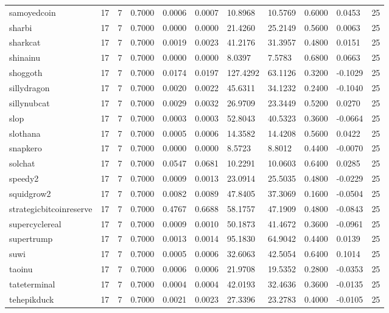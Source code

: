 \begin{table}[htbp]
\begin{tabular}{lllllllllll}
samoyedcoin & 17 & 7 & 0.7000 & 0.0006 & 0.0007 & 10.8968 & 10.5769 & 0.6000 & 0.0453 & 25 \\
sharbi & 17 & 7 & 0.7000 & 0.0000 & 0.0000 & 21.4260 & 25.2149 & 0.5600 & 0.0063 & 25 \\
sharkcat & 17 & 7 & 0.7000 & 0.0019 & 0.0023 & 41.2176 & 31.3957 & 0.4800 & 0.0151 & 25 \\
shinainu & 17 & 7 & 0.7000 & 0.0000 & 0.0000 & 8.0397 & 7.5783 & 0.6800 & 0.0663 & 25 \\
shoggoth & 17 & 7 & 0.7000 & 0.0174 & 0.0197 & 127.4292 & 63.1126 & 0.3200 & -0.1029 & 25 \\
sillydragon & 17 & 7 & 0.7000 & 0.0020 & 0.0022 & 45.6311 & 34.1232 & 0.2400 & -0.1040 & 25 \\
sillynubcat & 17 & 7 & 0.7000 & 0.0029 & 0.0032 & 26.9709 & 23.3449 & 0.5200 & 0.0270 & 25 \\
slop & 17 & 7 & 0.7000 & 0.0003 & 0.0003 & 52.8043 & 40.5323 & 0.3600 & -0.0664 & 25 \\
slothana & 17 & 7 & 0.7000 & 0.0005 & 0.0006 & 14.3582 & 14.4208 & 0.5600 & 0.0422 & 25 \\
snapkero & 17 & 7 & 0.7000 & 0.0000 & 0.0000 & 8.5723 & 8.8012 & 0.4400 & -0.0070 & 25 \\
solchat & 17 & 7 & 0.7000 & 0.0547 & 0.0681 & 10.2291 & 10.0603 & 0.6400 & 0.0285 & 25 \\
speedy2 & 17 & 7 & 0.7000 & 0.0009 & 0.0013 & 23.0914 & 25.5035 & 0.4800 & -0.0229 & 25 \\
squidgrow2 & 17 & 7 & 0.7000 & 0.0082 & 0.0089 & 47.8405 & 37.3069 & 0.1600 & -0.0504 & 25 \\
strategicbitcoinreserve & 17 & 7 & 0.7000 & 0.4767 & 0.6688 & 58.1757 & 47.1909 & 0.4800 & -0.0843 & 25 \\
supercyclereal & 17 & 7 & 0.7000 & 0.0009 & 0.0010 & 50.1873 & 41.4672 & 0.3600 & -0.0961 & 25 \\
supertrump & 17 & 7 & 0.7000 & 0.0013 & 0.0014 & 95.1830 & 64.9042 & 0.4400 & 0.0139 & 25 \\
suwi & 17 & 7 & 0.7000 & 0.0005 & 0.0006 & 32.6063 & 42.5054 & 0.6400 & 0.1014 & 25 \\
taoinu & 17 & 7 & 0.7000 & 0.0006 & 0.0006 & 21.9708 & 19.5352 & 0.2800 & -0.0353 & 25 \\
tateterminal & 17 & 7 & 0.7000 & 0.0004 & 0.0004 & 42.0193 & 32.4636 & 0.3600 & -0.0135 & 25 \\
tehepikduck & 17 & 7 & 0.7000 & 0.0021 & 0.0023 & 27.3396 & 23.2783 & 0.4000 & -0.0105 & 25 \\

\end{tabular}
\end{table}
